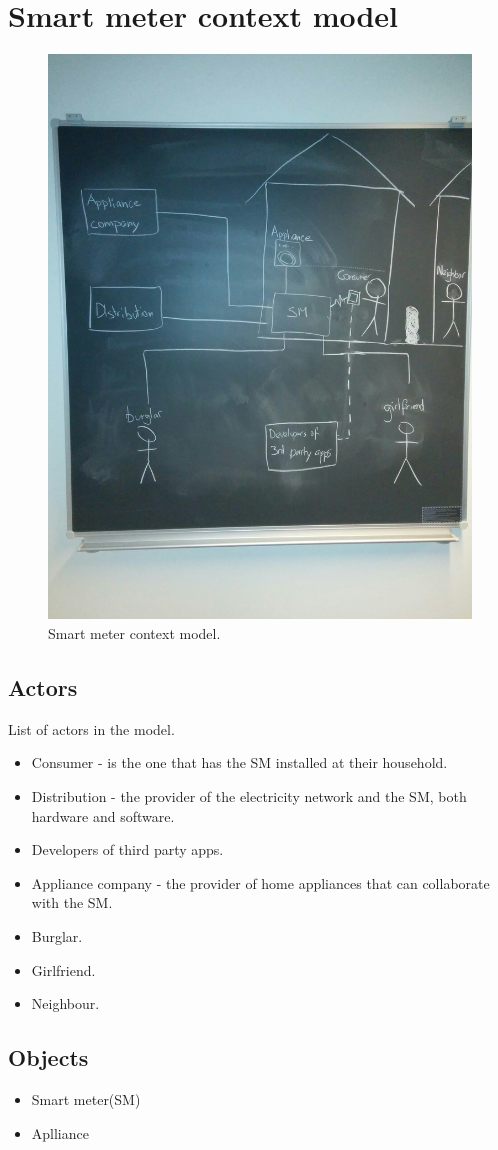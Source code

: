 \section{Smart meter context model}
\begin{figure}
  \includegraphics[width=\textwidth]{figures/situation.jpg}
  \caption{Smart meter context model.}
  \label{sm_model}
\end{figure}

\subsection{Actors}
List of actors in the model.
\begin{itemize}
\item Consumer - is the one that has the SM installed at their household.
\item Distribution - the provider of the electricity network and the SM, both hardware and software.
\item Developers of third party apps.
\item Appliance company - the provider of home appliances that can collaborate with the SM.
\item Burglar.
\item Girlfriend.
\item Neighbour.
\end{itemize}

\subsection{Objects}
\begin{itemize}
\item Smart meter(SM)
\item Aplliance
\end{itemize}
